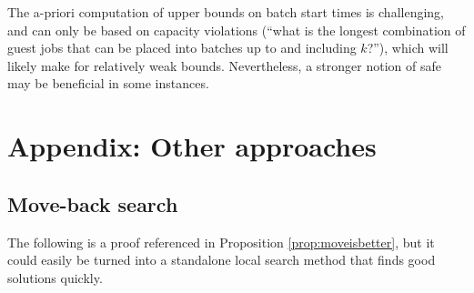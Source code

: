 \documentclass[13pt, letterpaper, oneside]{book}
\begin{document}
The a-priori computation of upper bounds on batch start times is challenging,
and can only be based on capacity violations (``what is the longest combination of
guest jobs that can be placed into batches up to and including $k$?''), which
will likely make for relatively weak bounds. Nevertheless, a stronger notion of
safe may be beneficial in some instances.

\chapter{Appendix: Other approaches}
\section{Move-back search}
The following is a proof referenced in Proposition \ref{prop:moveisbetter}, but
it could easily be turned into a standalone local search method that finds good
solutions quickly.
\end{document}
